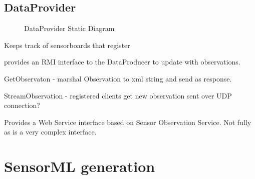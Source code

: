 \documentclass[]{final_report}
\begin{document}
\subsection {DataProvider}
 \begin{figure}
\caption{DataProvider Static Diagram}\label{fig:bon_static_diagam_provider.png}
\end{figure}
Keeps track of sensorboards that register

provides an RMI interface to the DataProducer to update with observations. 


GetObservaton - marshal Observation to xml string and send as response.

StreamObservation -  registered clients get new observation sent over UDP connection?

Provides a Web Service interface  based on Sensor Observation Service. Not fully as is a very complex interface.

\newpage
\section{SensorML generation}
\end{document}
